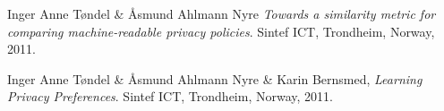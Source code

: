  


\begin{thebibliography}{99}


Inger Anne T{\o}ndel \& {\AA}smund Ahlmann Nyre
  \emph{Towards a similarity metric for comparing machine-readable privacy policies}.
Sintef ICT, Trondheim, Norway,
  2011.

  Inger Anne T{\o}ndel \& {\AA}smund Ahlmann Nyre \& Karin Bernsmed,
  \emph{Learning Privacy Preferences}.
  Sintef ICT, Trondheim, Norway,
  2011.

\end{thebibliography}

